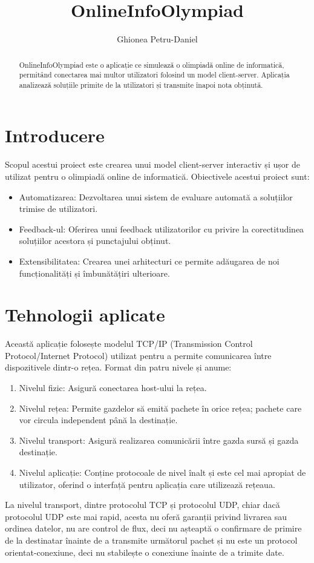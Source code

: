 \documentclass[runningheads]{llncs}
\begin{document}
\title{OnlineInfoOlympiad}
\author{Ghionea Petru-Daniel}
\maketitle
\begin{abstract}
OnlineInfoOlympiad este o aplicație ce simulează o olimpiadă online de informatică, permitând conectarea mai multor utilizatori folosind un model client-server. Aplicația analizează soluțiile primite de la utilizatori și transmite înapoi nota obținută.
\end{abstract}
\section{Introducere}
Scopul acestui proiect este crearea unui model client-server interactiv și ușor de utilizat pentru o olimpiadă online de informatică. Obiectivele acestui proiect sunt:
\begin{itemize}
  \item Automatizarea: Dezvoltarea unui sistem de evaluare automată a soluțiilor trimise de utilizatori.
  \item Feedback-ul: Oferirea unui feedback utilizatorilor cu privire la corectitudinea soluțiilor acestora și punctajului obținut.
  \item Extensibilitatea: Crearea unei arhitecturi ce permite adăugarea de noi funcționalități și îmbunătățiri ulterioare.
\end{itemize}
\section{Tehnologii aplicate}
Această aplicație folosește modelul TCP/IP (Transmission Control Protocol/Internet Protocol) utilizat pentru a permite comunicarea între dispozitivele dintr-o rețea. Format din patru nivele și anume:
\begin{enumerate}
  \item Nivelul fizic: Asigură conectarea host-ului la rețea.
  \item Nivelul rețea: Permite gazdelor să emită pachete în orice rețea; pachete care vor circula independent până la destinație.
  \item Nivelul transport: Asigură realizarea comunicării între gazda sursă și gazda destinație.
  \item Nivelul aplicație: Conține protocoale de nivel înalt și este cel mai apropiat de utilizator, oferind o interfață pentru aplicația care utilizează rețeaua.
\end{enumerate}
\hspace{1em} La nivelul transport, dintre protocolul TCP și protocolul UDP, chiar dacă protocolul UDP este mai rapid, acesta nu oferă garanții privind livrarea sau ordinea datelor, nu are control de flux, deci nu așteaptă o confirmare de primire de la destinatar înainte de a transmite următorul pachet și nu este un protocol orientat-conexiune, deci nu stabilește o conexiune înainte de a trimite date.
\end{document}
